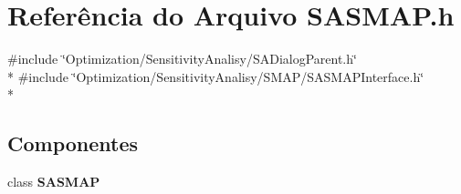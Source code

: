 \section{Referência do Arquivo S\+A\+S\+M\+A\+P.\+h}
\label{_s_a_s_m_a_p_8h}
{\ttfamily \#include \char`\"{}Optimization/\+Sensitivity\+Analisy/\+S\+A\+Dialog\+Parent.\+h\char`\"{}}\\*
{\ttfamily \#include \char`\"{}Optimization/\+Sensitivity\+Analisy/\+S\+M\+A\+P/\+S\+A\+S\+M\+A\+P\+Interface.\+h\char`\"{}}\\*
\subsection*{Componentes}
\begin{DoxyCompactItemize}
\item 
class {\bf S\+A\+S\+M\+AP}
\end{DoxyCompactItemize}
